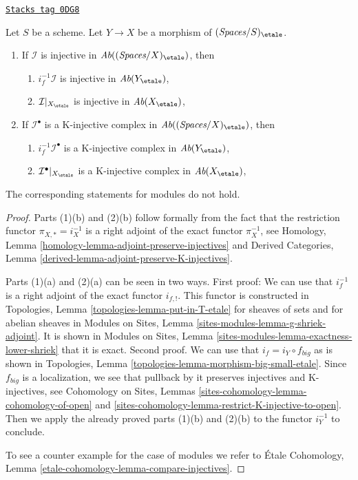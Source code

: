 \begin{lemma}
\label{spaces-more-cohomology-lemma-compare-injectives}
\href{https://stacks.math.columbia.edu/tag/0DG8}{\texttt{Stacks tag 0DG8}}

Let $S$ be a scheme.
Let $Y \to X$ be a morphism of $(\textit{Spaces}/S)_\etale$.
\begin{enumerate}
\item If $\mathcal{I}$ is injective in
$\textit{Ab}((\textit{Spaces}/X)_\etale)$, then
\begin{enumerate}
\item $i_f^{-1}\mathcal{I}$ is injective in $\textit{Ab}(Y_\etale)$,
\item $\mathcal{I}|_{X_\etale}$ is injective in $\textit{Ab}(X_\etale)$,
\end{enumerate}
\item If $\mathcal{I}^\bullet$ is a K-injective complex
in $\textit{Ab}((\textit{Spaces}/X)_\etale)$, then
\begin{enumerate}
\item $i_f^{-1}\mathcal{I}^\bullet$ is a K-injective complex in
$\textit{Ab}(Y_\etale)$,
\item $\mathcal{I}^\bullet|_{X_\etale}$ is a K-injective complex in
$\textit{Ab}(X_\etale)$,
\end{enumerate}
\end{enumerate}
The corresponding statements for modules do not hold.
\end{lemma}

\begin{proof}
Parts (1)(b) and (2)(b)
follow formally from the fact that the restriction functor
$\pi_{X, *} = i_X^{-1}$ is a right adjoint of the exact functor
$\pi_X^{-1}$, see
Homology, Lemma \ref{homology-lemma-adjoint-preserve-injectives} and
Derived Categories, Lemma \ref{derived-lemma-adjoint-preserve-K-injectives}.

\medskip\noindent
Parts (1)(a) and (2)(a) can be seen in two ways. First proof: We can use
that $i_f^{-1}$ is a right adjoint of the exact functor $i_{f, !}$.
This functor is constructed in
Topologies, Lemma \ref{topologies-lemma-put-in-T-etale}
for sheaves of sets and for abelian sheaves in
Modules on Sites, Lemma \ref{sites-modules-lemma-g-shriek-adjoint}.
It is shown in Modules on Sites, Lemma
\ref{sites-modules-lemma-exactness-lower-shriek} that it is exact.
Second proof. We can use that $i_f = i_Y \circ f_{big}$ as is shown
in Topologies, Lemma \ref{topologies-lemma-morphism-big-small-etale}.
Since $f_{big}$ is a localization, we see that pullback by it
preserves injectives and K-injectives, see
Cohomology on Sites, Lemmas \ref{sites-cohomology-lemma-cohomology-of-open} and
\ref{sites-cohomology-lemma-restrict-K-injective-to-open}.
Then we apply the already proved parts (1)(b) and (2)(b)
to the functor $i_Y^{-1}$ to conclude.

\medskip\noindent
To see a counter example for the case of modules we refer to
\'Etale Cohomology, Lemma \ref{etale-cohomology-lemma-compare-injectives}.
\end{proof}

